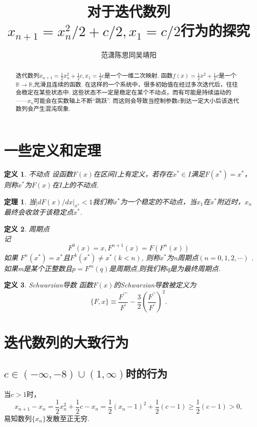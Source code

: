 \documentclass[a4paper]{article}%
\title{对于迭代数列$x_{n+1}=x_n^2/2+c/2,x_1=c/2$行为的探究}%
\author{范潇\phantom{1}陈思同\phantom{1}吴靖阳}%
\date{}%
\newtheorem{thm}{定理}
\newtheorem{definiton}{定义}
\newcommand*\abs[1]{\lvert#1\rvert}%
\begin{document}
  \maketitle  
\begin{abstract}
迭代数列$x_{n+1}=\frac{1}{2}x_{n}^2+\frac{1}{2}c,x_1=\frac{1}{2}c$是一个一维二次映射.
函数$f(x)=\frac{1}{2}x^2+\frac{1}{2}c$是一个$\mathbb{R} \to \mathbb{R} $,光滑且连续的函数.
在这样的一个系统中，很多初始值在经过多次迭代后，往往会稳定在某些状态中.
这些状态不一定是稳定在某个不动点，而有可能是持续运动的——$x_n$可能会在实数轴上不断“跳跃”.
而这则会导致当控制参数c到达一定大小后该迭代数列会产生混沌现象.\\
\end{abstract}

\section{一些定义和定理}

\begin{definiton}不动点 \phantom{1}
    设函数$F(x)$在区间$I$上有定义，若存在$x^*\in I$满足$F(x^*)=x^*$，则称$x^*$为$F(x)$在$I$上的不动点.\end{definiton}
\begin{thm}当$\abs{dF(x)/dx}_{x^*}<1$我们称$x^*$为一个稳定的不动点，当$x_1$在$x^*$附近时，$x_n$最终会收敛于该稳定点$x^*$.\cite{e}\end{thm}
\begin{definiton}周期点 \phantom{1}\\记\[F^{0}(x)=x,F^{n+1}(x)=F(F^{n}(x))\]
如果
$F^{n}(x^*)=x^*$且$F^{k}(x^*)\neq x^*$\phantom{1}$(k<n)$,
则称$x^*$为n周期点$(n=0,1,2,\cdots )$ .如果m是某个正整数且$p=F^{m}(q)$是周期点,则我们称q是为最终周期点.\end{definiton}

\begin{definiton}Schwarzian导数 \phantom{1}
函数$F(x)$的Schwarzian导数被定义为\[\{F,x\}\equiv \frac{F^{\prime \prime \prime }}{F^{\prime}}-\frac{3}{2}(\frac{F^{\prime \prime}}{F^{\prime}})^2.\]
\end{definiton}
\section{迭代数列的大致行为}

\subsection{$c\in (-\infty ,-8)\cup  (1,\infty)$时的行为}
当$c>1$时，\[x_{n+1}-x_{n}=\frac{1}{2}x_n^2+\frac{1}{2}c-x_n=\frac{1}{2}(x_n-1)^2+\frac{1}{2}(c-1)\ge\frac{1}{2}(c-1)>0,\]
易知数列$\{x_n\}$发散至正无穷.
\end{document}
